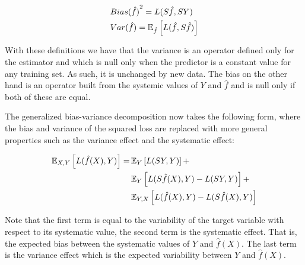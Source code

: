 \begin{appendices}
\begin{equation}
\begin{split}
& {Bias(\hat{f})}^2 = L(S\hat{f},SY) \\
& Var(\hat{f}) = \operatorname{\mathbb{E}}_{\hat{f}} \left[ L(\hat{f} , S\hat{f}) \right]
\end{split}
\end{equation}

With these definitions we have that the variance is an operator defined only for the estimator and which is null only when the predictor is a constant value for any training set.
As such, it is unchanged by new data.
The bias on the other hand is an operator built from the systemic values of $Y$ and $\hat{f}$ and is null only if both of these are equal.

The generalized bias-variance decomposition now takes the following form, where the bias and variance of the squared loss are replaced with more general properties such as the variance effect and the systematic effect:

\begin{equation}
\begin{split}
\operatorname{\mathbb{E}}_{X,Y} \left[ L(\hat{f}(X),Y )\right] = & \operatorname{\mathbb{E}}_{Y} \left[ L(SY,Y )\right] + \\
 & \operatorname{\mathbb{E}}_{Y} \left[ L(S\hat{f}(X),Y ) - L(SY,Y )\right] + \\
 & \operatorname{\mathbb{E}}_{Y,X} \left[ L(\hat{f}(X),Y ) - L(S\hat{f}(X),Y )\right]
\end{split}
\end{equation}

Note that the first term is equal to the variability of the target variable with respect to its systematic value, the second term is the systematic effect.
That is, the expected bias between the systematic values of $Y$ and $\hat{f}(X)$.
The last term is the variance effect which is the expected variability between $Y$ and $\hat{f}(X)$.



\end{appendices}
